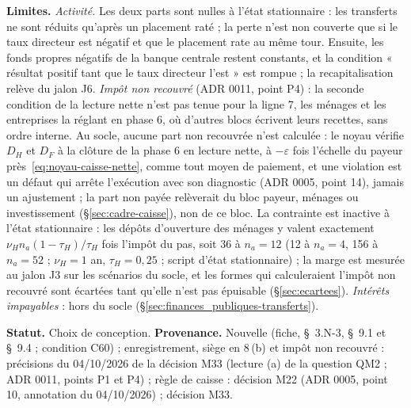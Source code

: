 \documentclass[11pt,a4paper]{article}
\newcommand{\limites}{\par\noindent\textbf{Limites.} }
\begin{document}
\begin{proposee}
\limites \emph{Activité.} Les deux parts sont nulles à l'état stationnaire : les transferts ne sont réduits qu'après un placement raté ; la perte n'est non couverte que si le taux directeur est négatif et que le placement rate au même tour. Ensuite, les fonds propres négatifs de la banque centrale restent constants, et la condition « résultat positif tant que le taux directeur l'est » est rompue ; la recapitalisation relève du jalon J6. \emph{Impôt non recouvré} (ADR 0011, point P4) : la seconde condition de la lecture nette n'est pas tenue pour la ligne 7, les ménages et les entreprises la réglant en phase 6, où d'autres blocs écrivent leurs recettes, sans ordre interne. Au socle, aucune part non recouvrée n'est calculée : le noyau vérifie $D_H$ et $D_F$ à la clôture de la phase 6 en lecture nette, à $-\varepsilon$ fois l'échelle du payeur près~\eqref{eq:noyau-caisse-nette}, comme tout moyen de paiement, et une violation est un défaut qui arrête l'exécution avec son diagnostic (ADR 0005, point 14), jamais un ajustement ; la part non payée relèverait du bloc payeur, ménages ou investissement (\S\ref{sec:cadre-caisse}), non de ce bloc. La contrainte est inactive à l'état stationnaire : les dépôts d'ouverture des ménages y valent exactement $\nu_H n_a(1 - \tau_H)/\tau_H$ fois l'impôt du pas, soit 36 à $n_a = 12$ (12 à $n_a = 4$, 156 à $n_a = 52$ ; $\nu_H = 1$ an, $\tau_H = 0{,}25$ ; script d'état stationnaire) ; la marge est mesurée au jalon J3 sur les scénarios du socle, et les formes qui calculeraient l'impôt non recouvré sont écartées tant qu'elle n'est pas épuisable (\S\ref{sec:ecartees}). \emph{Intérêts impayables} : hors du socle (\S\ref{sec:finances_publiques-transferts}).

\textbf{Statut.} Choix de conception. \textbf{Provenance.} Nouvelle (fiche, \S~3.N-3, \S~9.1 et \S~9.4 ; condition C60) ; enregistrement, siège en 8\,(b) et impôt non recouvré : précisions du 04/10/2026 de la décision M33 (lecture (a) de la question QM2 ; ADR 0011, points P1 et P4) ; règle de caisse : décision M22 (ADR 0005, point 10, annotation du 04/10/2026) ; décision M33.
\end{proposee}
\end{document}
